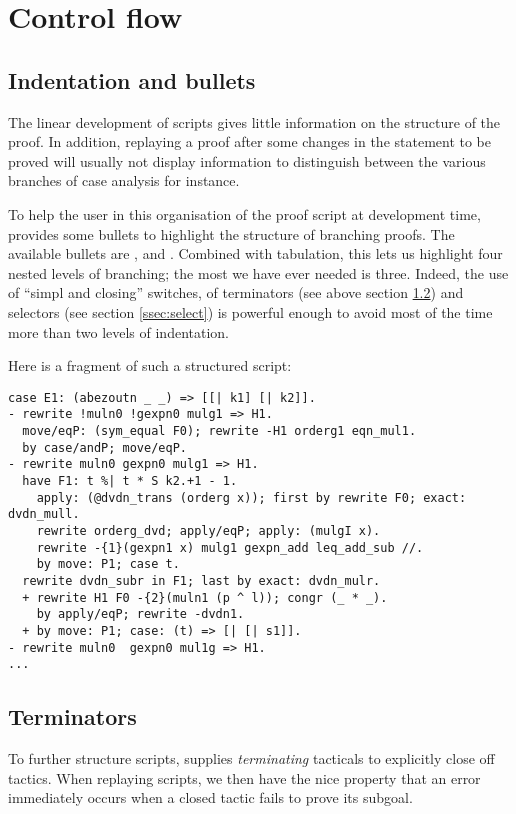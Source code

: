 \section{Control flow}
\subsection{Indentation and bullets}\label{ssec:indent}

The linear development of \Coq{} scripts gives little information on
the structure of the proof. In addition, replaying a proof after some
changes in the statement to be proved will usually not display information to
distinguish between the various branches of case analysis for instance.

To help the user in this organisation of the proof script at
development time, \ssr{} provides some bullets to highlight the
structure of branching proofs. The available bullets are \C{-}, 
\C{+} and \C{*}. Combined with tabulation, this lets us highlight four
nested levels of branching; the most we have ever
needed is three. Indeed, the use of ``simpl and closing'' switches, of
terminators (see above section \ref{ssec:termin}) and selectors (see
 section \ref{ssec:select}) is powerful enough
to avoid most of the time more than two levels of indentation.

Here is a fragment of such a structured script:

\begin{lstlisting}
case E1: (abezoutn _ _) => [[| k1] [| k2]].
- rewrite !muln0 !gexpn0 mulg1 => H1. 
  move/eqP: (sym_equal F0); rewrite -H1 orderg1 eqn_mul1.
  by case/andP; move/eqP. 
- rewrite muln0 gexpn0 mulg1 => H1. 
  have F1: t %| t * S k2.+1 - 1.
    apply: (@dvdn_trans (orderg x)); first by rewrite F0; exact: dvdn_mull.
    rewrite orderg_dvd; apply/eqP; apply: (mulgI x).
    rewrite -{1}(gexpn1 x) mulg1 gexpn_add leq_add_sub //.
    by move: P1; case t.
  rewrite dvdn_subr in F1; last by exact: dvdn_mulr.
  + rewrite H1 F0 -{2}(muln1 (p ^ l)); congr (_ * _).
    by apply/eqP; rewrite -dvdn1.
  + by move: P1; case: (t) => [| [| s1]].
- rewrite muln0  gexpn0 mul1g => H1. 
...
\end{lstlisting}

\subsection{Terminators}\label{ssec:termin}
To further structure scripts, \ssr{}
supplies \emph{terminating} tacticals to explicitly close off tactics. 
When replaying scripts, we then have the nice property that
an error immediately occurs when a closed tactic fails to prove its
subgoal.

